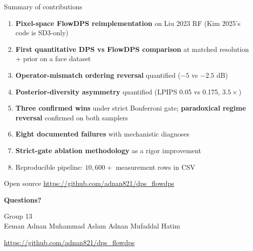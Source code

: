 \documentclass[10pt,aspectratio=169]{beamer}
\begin{document}
\begin{frame}{Summary of contributions}
  \begin{enumerate}
    \item \textbf{Pixel-space FlowDPS reimplementation} on Liu 2023 RF
          (Kim 2025's code is SD3-only)
    \item \textbf{First quantitative DPS vs FlowDPS comparison} at matched
          resolution + prior on a face dataset
    \item \textbf{Operator-mismatch ordering reversal} quantified
          ($-5$ vs $-2.5$ dB)
    \item \textbf{Posterior-diversity asymmetry} quantified
          (LPIPS 0.05 vs 0.175, $3.5\times$)
    \item \textbf{Three confirmed wins} under strict Bonferroni gate;
          \textbf{paradoxical regime reversal} confirmed on both samplers
    \item \textbf{Eight documented failures} with mechanistic diagnoses
    \item \textbf{Strict-gate ablation methodology} as a rigor improvement
    \item Reproducible pipeline: $10{,}600+$ measurement rows in CSV
  \end{enumerate}

  \begin{block}{Open source}
    \url{https://github.com/adnan821/dps_flowdps}
  \end{block}
\end{frame}

\begin{frame}[plain]{}
  \centering
  \vspace{2em}
  {\Huge\bfseries Questions?}

  \vspace{2em}
  {\large Group 13 \\[0.5em]
  Eeman Adnan \quad Muhammad Aslam Adnan \quad Mufaddal Hatim}

  \vspace{2em}
  {\small\url{https://github.com/adnan821/dps_flowdps}}
\end{frame}
\end{document}
